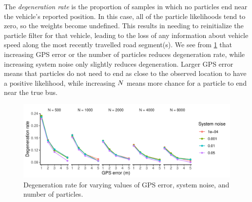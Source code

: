 The \emph{degeneration rate} is the proportion of samples in which no particles end near the vehicle's reported position. In this case, all of the particle likelihoods tend to zero, so the weights become undefined. This results in needing to reinitialize the particle filter for that vehicle, leading to the loss of any information about vehicle speed along the most recently travelled road segment(s). We see from \cref{fig:model_performance_degen} that increasing GPS error or the number of particles reduces degeneration rate, while increasing system noise only slightly reduces degeneration. Larger GPS error means that particles do not need to end as close to the observed location to have a positive likelihood, while increasing $N$ means more chance for a particle to end near the true bus.

\begin{knitrout}
\color{fgcolor}\begin{figure}

{\centering \includegraphics[width=\textwidth]{figure/model_performance_degen-1} 

}

\caption[Degeneration rate for varying values of GPS error, system noise, and number of particles]{Degeneration rate for varying values of GPS error, system noise, and number of particles.}\label{fig:model_performance_degen}
\end{figure}


\end{knitrout}


